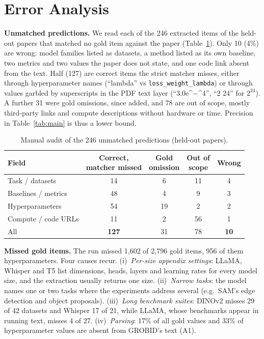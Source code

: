 \documentclass[conference]{IEEEtran}
\begin{document}
\section{Error Analysis}\label{sec:errors}

\textbf{Unmatched predictions.} We read each of the 246 extracted items of the held-out
papers that matched no gold item against the paper (Table~\ref{tab:audit}). Only 10 (4\%)
are wrong: model families listed as datasets, a method listed as its own baseline, two
metrics and two values the paper does not state, and one code link absent from the text.
Half (127) are correct items the strict matcher misses, either through hyperparameter
names (``lambda'' vs \texttt{loss\_weight\_lambda}) or through values garbled by
superscripts in the PDF text layer (``3.0e\^{}$-$\^{}4'', ``2 24'' for $2^{24}$). A
further 31 were gold omissions, since added, and 78 are out of scope, mostly third-party
links and compute descriptions without hardware or time. Precision in Table~\ref{tab:main}
is thus a lower bound.

\begin{table}[t]
\caption{Manual audit of the 246 unmatched predictions (held-out papers).}
\label{tab:audit}
\centering
\footnotesize
\setlength{\tabcolsep}{3.5pt}
\begin{tabular}{@{}lcccc@{}}
\toprule
Field & \makecell{Correct,\\matcher missed} & \makecell{Gold\\omission} & \makecell{Out of\\scope} & Wrong \\
\midrule
Task / datasets & 14 & 6 & 11 & 4 \\
Baselines / metrics & 48 & 4 & 9 & 3 \\
Hyperparameters & 54 & 19 & 2 & 2 \\
Compute / code URLs & 11 & 2 & 56 & 1 \\
\midrule
All & \textbf{127} & 31 & 78 & \textbf{10} \\
\bottomrule
\end{tabular}
\end{table}

\textbf{Missed gold items.} The run missed 1{,}602 of 2{,}796 gold items, 956 of them
hyperparameters. Four causes recur. (i)~\emph{Per-size appendix settings}: LLaMA, Whisper
and T5 list dimensions, heads, layers and learning rates for every model size, and the
extraction usually returns one size. (ii)~\emph{Narrow tasks}: the model names one or two
tasks where the experiments address several (e.g.\ SAM's edge detection and object
proposals). (iii)~\emph{Long benchmark suites}: DINOv2 misses 29 of 42 datasets and Whisper
17 of 21, while LLaMA, whose benchmarks appear in running text, misses 4 of 27.
(iv)~\emph{Parsing}: 17\% of all gold values and 33\% of hyperparameter values are absent
from GROBID's text (A1).
\end{document}
